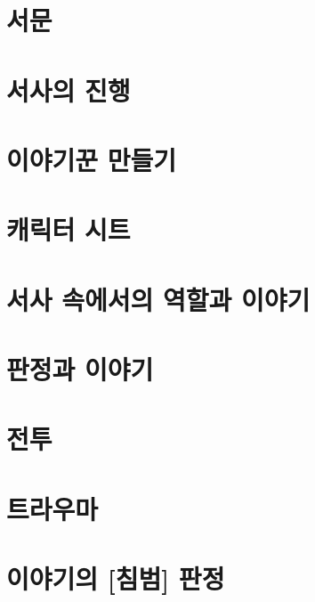 \documentclass{report}
\begin{document}
	\ifprintout\else
		\parttoc
	\fi
	
	\chapter{서문}
		
	
	\hypertarget{story-progression}{}
	\chapter{서사의 진행}
		
	
	\chapter{이야기꾼 만들기}
		
	
	\hypertarget{sheets}{}
	\chapter{캐릭터 시트}
		
	
	\chapter{서사 속에서의 역할과 이야기}
		
	
	\chapter{판정과 이야기}
		
	
	\chapter{전투}
		
	
	\hypertarget{trauma}{}
	\chapter{트라우마}
		
	
	\hypertarget{intrusion}{}
	\chapter{이야기의 [침범] 판정}
		
	
	\hypertarget{growth}{}
\end{document}
